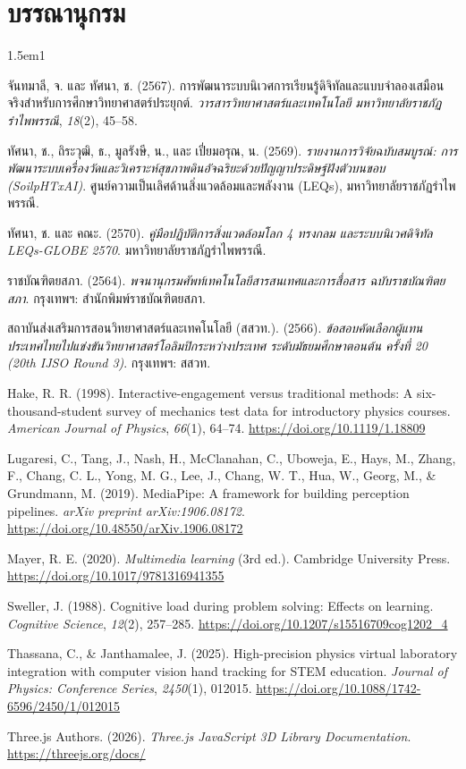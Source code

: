 \chapter*{บรรณานุกรม}

\begin{hangparas}{1.5em}{1}

จันทมาลี, จ. และ ทัศนา, ช. (2567). การพัฒนาระบบนิเวศการเรียนรู้ดิจิทัลและแบบจำลองเสมือนจริงสำหรับการศึกษาวิทยาศาสตร์ประยุกต์. \textit{วารสารวิทยาศาสตร์และเทคโนโลยี มหาวิทยาลัยราชภัฏรำไพพรรณี}, \textit{18}(2), 45--58.

ทัศนา, ช., ถิระวุฒิ, ธ., มูลรังษี, น., และ เปี่ยมอรุณ, น. (2569). \textit{รายงานการวิจัยฉบับสมบูรณ์: การพัฒนาระบบเครื่องวัดและวิเคราะห์สุขภาพดินอัจฉริยะด้วยปัญญาประดิษฐ์ฝังตัวบนขอบ (SoilpHTxAI)}. ศูนย์ความเป็นเลิศด้านสิ่งแวดล้อมและพลังงาน (LEQs), มหาวิทยาลัยราชภัฏรำไพพรรณี.

ทัศนา, ช. และ คณะ. (2570). \textit{คู่มือปฏิบัติการสิ่งแวดล้อมโลก 4 ทรงกลม และระบบนิเวศดิจิทัล LEQs-GLOBE 2570}. มหาวิทยาลัยราชภัฏรำไพพรรณี.

ราชบัณฑิตยสภา. (2564). \textit{พจนานุกรมศัพท์เทคโนโลยีสารสนเทศและการสื่อสาร ฉบับราชบัณฑิตยสภา}. กรุงเทพฯ: สำนักพิมพ์ราชบัณฑิตยสภา.

สถาบันส่งเสริมการสอนวิทยาศาสตร์และเทคโนโลยี (สสวท.). (2566). \textit{ข้อสอบคัดเลือกผู้แทนประเทศไทยไปแข่งขันวิทยาศาสตร์โอลิมปิกระหว่างประเทศ ระดับมัธยมศึกษาตอนต้น ครั้งที่ 20 (20th IJSO Round 3)}. กรุงเทพฯ: สสวท.

Hake, R. R. (1998). Interactive-engagement versus traditional methods: A six-thousand-student survey of mechanics test data for introductory physics courses. \textit{American Journal of Physics}, \textit{66}(1), 64--74. \url{https://doi.org/10.1119/1.18809}

Lugaresi, C., Tang, J., Nash, H., McClanahan, C., Uboweja, E., Hays, M., Zhang, F., Chang, C. L., Yong, M. G., Lee, J., Chang, W. T., Hua, W., Georg, M., \& Grundmann, M. (2019). MediaPipe: A framework for building perception pipelines. \textit{arXiv preprint arXiv:1906.08172}. \url{https://doi.org/10.48550/arXiv.1906.08172}

Mayer, R. E. (2020). \textit{Multimedia learning} (3rd ed.). Cambridge University Press. \url{https://doi.org/10.1017/9781316941355}

Sweller, J. (1988). Cognitive load during problem solving: Effects on learning. \textit{Cognitive Science}, \textit{12}(2), 257--285. \url{https://doi.org/10.1207/s15516709cog1202_4}

Thassana, C., \& Janthamalee, J. (2025). High-precision physics virtual laboratory integration with computer vision hand tracking for STEM education. \textit{Journal of Physics: Conference Series}, \textit{2450}(1), 012015. \url{https://doi.org/10.1088/1742-6596/2450/1/012015}

Three.js Authors. (2026). \textit{Three.js JavaScript 3D Library Documentation}. \url{https://threejs.org/docs/}

\end{hangparas}
